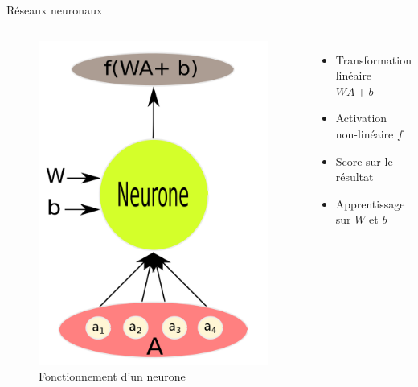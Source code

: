 \documentclass{beamer}
\begin{document}
\begin{frame}{Réseaux neuronaux}

  \begin{columns}
    \begin{figure}
      \centering
      \includegraphics[scale=0.10]{../Figures/Neuron}
      \caption{Fonctionnement d'un neurone}
    \end{figure}

    \begin{itemize}
    \item Transformation linéaire $WA + b$\pause
    \item Activation non-linéaire $f$ \pause
    \item Score sur le résultat \pause
    \item Apprentissage sur $W$ et $b$
    \end{itemize}
  \end{columns}

\end{frame}
\end{document}
